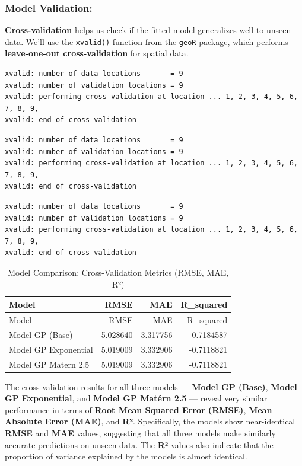\documentclass[
  11pt,
]{article}
\begin{document}
\subsubsection{Model Validation:}\label{model-validation}

\textbf{Cross-validation} helps us check if the fitted model generalizes
well to unseen data. We'll use the \texttt{xvalid()} function from the
\texttt{geoR} package, which performs \textbf{leave-one-out
cross-validation} for spatial data.

\begin{verbatim}
xvalid: number of data locations       = 9
xvalid: number of validation locations = 9
xvalid: performing cross-validation at location ... 1, 2, 3, 4, 5, 6, 7, 8, 9, 
xvalid: end of cross-validation
\end{verbatim}

\begin{verbatim}
xvalid: number of data locations       = 9
xvalid: number of validation locations = 9
xvalid: performing cross-validation at location ... 1, 2, 3, 4, 5, 6, 7, 8, 9, 
xvalid: end of cross-validation
\end{verbatim}

\begin{verbatim}
xvalid: number of data locations       = 9
xvalid: number of validation locations = 9
xvalid: performing cross-validation at location ... 1, 2, 3, 4, 5, 6, 7, 8, 9, 
xvalid: end of cross-validation
\end{verbatim}

\begin{longtable}[]{@{}lrrr@{}}
\caption{Model Comparison: Cross-Validation Metrics (RMSE, MAE,
R²)}\tabularnewline
\toprule\noalign{}
Model & RMSE & MAE & R\_squared \\
\midrule\noalign{}
\endfirsthead
\toprule\noalign{}
Model & RMSE & MAE & R\_squared \\
\midrule\noalign{}
\endhead
\bottomrule\noalign{}
\endlastfoot
Model GP (Base) & 5.028640 & 3.317756 & -0.7184587 \\
Model GP Exponential & 5.019009 & 3.332906 & -0.7118821 \\
Model GP Matern 2.5 & 5.019009 & 3.332906 & -0.7118821 \\
\end{longtable}

The cross-validation results for all three models --- \textbf{Model GP
(Base)}, \textbf{Model GP Exponential}, and \textbf{Model GP Matérn 2.5}
--- reveal very similar performance in terms of \textbf{Root Mean
Squared Error (RMSE)}, \textbf{Mean Absolute Error (MAE)}, and
\textbf{R²}. Specifically, the models show near-identical \textbf{RMSE}
and \textbf{MAE} values, suggesting that all three models make similarly
accurate predictions on unseen data. The \textbf{R²} values also
indicate that the proportion of variance explained by the models is
almost identical.
\end{document}
